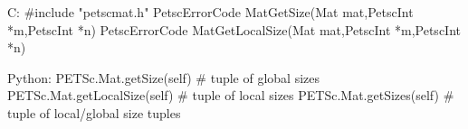 C:
#include "petscmat.h"
PetscErrorCode MatGetSize(Mat mat,PetscInt *m,PetscInt *n)
PetscErrorCode MatGetLocalSize(Mat mat,PetscInt *m,PetscInt *n)

Python:
PETSc.Mat.getSize(self) # tuple of global sizes
PETSc.Mat.getLocalSize(self) # tuple of local sizes
PETSc.Mat.getSizes(self) # tuple of local/global size tuples
